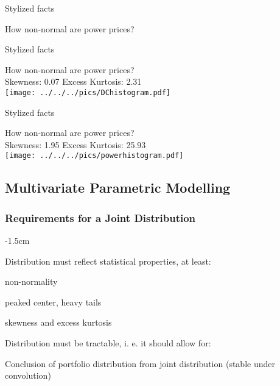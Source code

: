 {Stylized facts}
\begin{center}
How non-normal are power prices?\\
\end{center}

{Stylized facts}
\begin{center}
How non-normal are power prices?\\
Skewness: 0.07 \hspace{2cm} Excess Kurtosis: 2.31\\
\texttt{[image: ../../../pics/DChistogram.pdf]}
\end{center}

{Stylized facts} %
\begin{center}
How non-normal are power prices?\\
Skewness: 1.95 \hspace{2cm} Excess Kurtosis: 25.93\\
\texttt{[image: ../../../pics/powerhistogram.pdf]}
\end{center}

\subsection{Multivariate Parametric Modelling}
\subsubsection{Requirements for a Joint Distribution}

{-1.5cm}






	Distribution must reflect statistical properties, at least:


	non-normality


	peaked center, heavy tails


	skewness and excess kurtosis


	Distribution must be tractable, i. e. it should allow for:


	Conclusion of portfolio distribution from joint distribution (stable under convolution)


